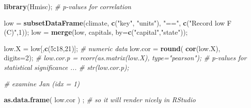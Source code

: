 \documentclass[
]{article}
\newenvironment{Shaded}{\begin{snugshade}}{\end{snugshade}}
\newcommand{\CommentTok}[1]{\textcolor[rgb]{0.56,0.35,0.01}{\textit{#1}}}
\newcommand{\DataTypeTok}[1]{\textcolor[rgb]{0.13,0.29,0.53}{#1}}
\newcommand{\DecValTok}[1]{\textcolor[rgb]{0.00,0.00,0.81}{#1}}
\newcommand{\KeywordTok}[1]{\textcolor[rgb]{0.13,0.29,0.53}{\textbf{#1}}}
\newcommand{\NormalTok}[1]{#1}
\newcommand{\OperatorTok}[1]{\textcolor[rgb]{0.81,0.36,0.00}{\textbf{#1}}}
\newcommand{\StringTok}[1]{\textcolor[rgb]{0.31,0.60,0.02}{#1}}
\begin{document}
\begin{Shaded}
\begin{Highlighting}[]
\KeywordTok{library}\NormalTok{(Hmisc); }\CommentTok{\# p{-}values for correlation}

\NormalTok{low =}\StringTok{ }\KeywordTok{subsetDataFrame}\NormalTok{(climate, }\KeywordTok{c}\NormalTok{(}\StringTok{"key"}\NormalTok{, }\StringTok{"units"}\NormalTok{), }\StringTok{"=="}\NormalTok{, }\KeywordTok{c}\NormalTok{(}\StringTok{"Record low F (C)"}\NormalTok{,}\DecValTok{1}\NormalTok{));}
\NormalTok{low =}\StringTok{ }\KeywordTok{merge}\NormalTok{(low, capitals, }\DataTypeTok{by=}\KeywordTok{c}\NormalTok{(}\StringTok{"capital"}\NormalTok{,}\StringTok{"state"}\NormalTok{));}

\NormalTok{low.X =}\StringTok{ }\NormalTok{low[,}\KeywordTok{c}\NormalTok{(}\DecValTok{5}\OperatorTok{:}\DecValTok{18}\NormalTok{,}\DecValTok{21}\NormalTok{)]; }\CommentTok{\# numeric data}
\NormalTok{low.cor =}\StringTok{ }\KeywordTok{round}\NormalTok{( }\KeywordTok{cor}\NormalTok{(low.X), }\DataTypeTok{digits=}\DecValTok{2}\NormalTok{);}
\CommentTok{\# low.cor.p = rcorr(as.matrix(low.X), type="pearson");  \# p{-}values for statistical significance ... \# str(low.cor.p);}

\CommentTok{\# examine Jan (idx = 1)}

\KeywordTok{as.data.frame}\NormalTok{( low.cor ) ; }\CommentTok{\# so it will render nicely in RStudio}
\end{Highlighting}
\end{Shaded}
\end{document}
